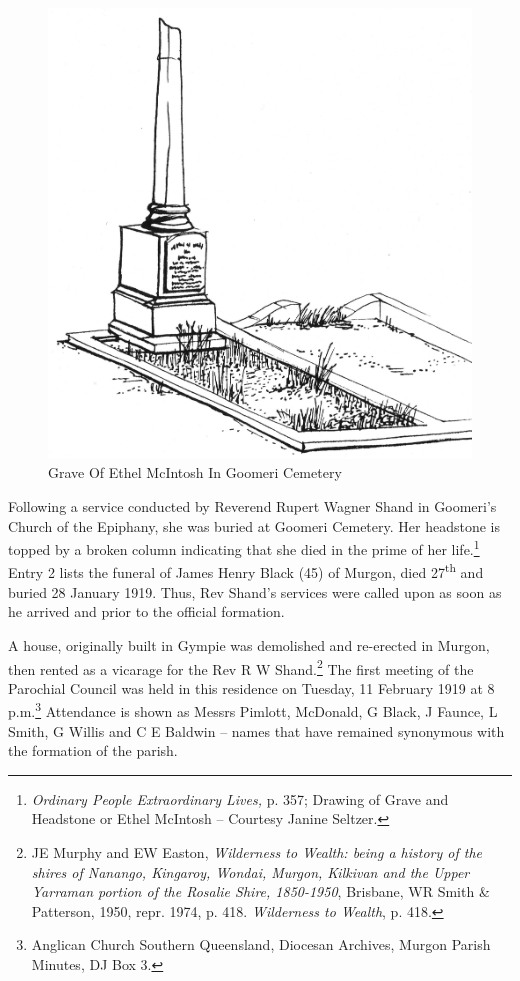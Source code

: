 \begin{figure}[!h]
\begin{center}
\includegraphics[width=.6\textwidth,center]{images/graveOfEthelMcIntoshInGoomeriCemetery.jpg}
\caption{Grave Of Ethel McIntosh In Goomeri Cemetery}
\end{center}
\end{figure}


Following a service conducted by Reverend Rupert Wagner Shand in
Goomeri's Church of the Epiphany, she was buried at Goomeri Cemetery.
Her headstone is topped by a broken column indicating that she died in
the prime of her life.\footnote{\emph{Ordinary People Extraordinary
  Lives,} p. 357; Drawing of Grave and Headstone or Ethel McIntosh --
  Courtesy Janine Seltzer.} Entry 2 lists the funeral of James Henry
Black (45) of Murgon, died 27\textsuperscript{th} and buried 28 January
1919. Thus, Rev Shand's services were called upon as soon as he arrived
and prior to the official formation.

A house, originally built in Gympie was demolished and re-erected in
Murgon, then rented as a vicarage for the Rev R W Shand.\footnote{JE
  Murphy and EW Easton, \emph{Wilderness to Wealth: being a history of
  the shires of Nanango, Kingaroy, Wondai, Murgon, Kilkivan and the
  Upper Yarraman portion of the Rosalie Shire, 1850-1950}, Brisbane, WR
  Smith \& Patterson, 1950, repr. 1974, p. 418. \emph{Wilderness to
  Wealth}, p. 418.} The first meeting of the Parochial Council was held
in this residence on Tuesday, 11 February 1919 at 8 p.m.\footnote{Anglican
  Church Southern Queensland, Diocesan Archives, Murgon Parish Minutes,
  DJ Box 3.} Attendance is shown as Messrs Pimlott, McDonald, G Black, J
Faunce, L Smith, G Willis and C E Baldwin -- names that have remained
synonymous with the formation of the parish.


